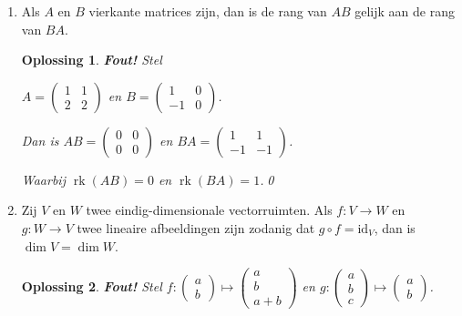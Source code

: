 \documentclass[a4paper,12pt]{article}
\newtheorem{oplossing}{Oplossing}
\begin{document}
\begin{enumerate}
    \item[(i)] Als $A$ en $B$ vierkante matrices zijn, dan is de rang van $AB$ gelijk aan de rang van $BA$.
    \begin{oplossing}
        \textbf{Fout!}
        Stel

        \(A =
        \begin{pmatrix}
            1 & 1 \\
            2 & 2
        \end{pmatrix}
        \)
        en
        \(B =
        \begin{pmatrix}
            1 & 0 \\
            -1 & 0
        \end{pmatrix}
        \).

        Dan is
        \(AB =
        \begin{pmatrix}
            0 & 0 \\
            0 & 0
        \end{pmatrix}
        \)
        en
        \(BA =
        \begin{pmatrix}
            1 & 1 \\
            -1 & -1
        \end{pmatrix}
        \).

        Waarbij \(\operatorname{rk}(AB) = 0\) en \(\operatorname{rk}(BA) = 1\).\qed
    \end{oplossing}
    \item[(ii)] Zij $V$ en $W$ twee eindig-dimensionale vectorruimten. Als $f:V \to W$ en $g:W \to V$ twee lineaire afbeeldingen zijn zodanig dat $g \circ f = \text{id}_{V}$, dan is $\dim V = \dim W$.
    \begin{oplossing}
        \textbf{Fout!}
        Stel \(f: \begin{pmatrix}
            a \\
            b
        \end{pmatrix}
        \mapsto
        \begin{pmatrix}
            a \\ b \\ a+b
        \end{pmatrix}
        \)
        en
        \(g: \begin{pmatrix}
            a \\ b \\ c
        \end{pmatrix}
        \mapsto
        \begin{pmatrix}
            a \\ b
        \end{pmatrix}\).


\end{oplossing}
\end{enumerate}
\end{document}
